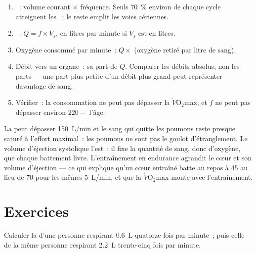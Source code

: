 \begin{method}\label{met:g10:heart-lungs-effort:compute}
\begin{enumerate}
  \item {}~: volume courant $\times$ fréquence. Seuls 70~\%
        environ de chaque cycle atteignent les ~; le reste
        emplit les voies aériennes.
  \item {}~: $Q = f \times V_s$, en litres par minute si
        $V_s$ est en litres.
  \item Oxygène consommé par minute~: $Q \times$ (oxygène retiré par
        litre de sang).
  \item Débit vers un organe~: sa part de $Q$. Comparer les débits
        absolus, non les parts --- une part plus petite d'un débit plus
        grand peut représenter davantage de sang.
  \item Vérifier~: la consommation ne peut pas dépasser la
        $\dot V\!\mathrm{O_2}$max, et $f$ ne peut pas dépasser environ
        $220 - $ l'âge.
\end{enumerate}
\end{method}

\begin{remark}\label{rem:g10:heart-lungs-effort:limit}
La  peut dépasser \qty{150}{L/min} et le sang qui quitte les
poumons reste presque saturé à l'effort maximal~: les poumons ne sont
pas le goulot d'étranglement. Le volume d'éjection systolique l'est~: il
fixe la quantité de sang, donc d'oxygène, que chaque battement livre.
L'entraînement en endurance agrandit le cœur et son volume d'éjection
--- ce qui explique qu'un cœur entraîné batte au repos à 45 au lieu de
70 pour les mêmes \qty{5}{L/min}, et que la
$\dot V\!\mathrm{O_2}$max monte avec l'entraînement.
\end{remark}

\section{Exercices}

\begin{exercise}[$\star$]\label{exo:g10:heart-lungs-effort:1}
Calculer la  d'une personne respirant \qty{0.6}{L} quatorze
fois par minute~; puis celle de la même personne respirant \qty{2.2}{L}
trente-cinq fois par minute.
\end{exercise}

